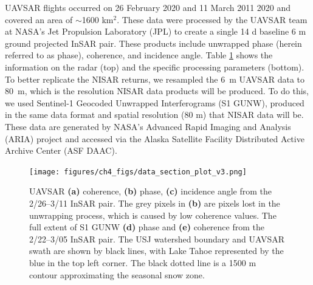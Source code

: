 UAVSAR flights occurred on 26 February 2020 and 11 March 2011 2020 and covered an area of $\sim$1600 km$^{2}$. These data were processed by the UAVSAR team at NASA's Jet Propulsion Laboratory (JPL) to create a single 14 d baseline 6 m ground projected InSAR pair. These products include unwrapped phase (herein referred to as phase), coherence, and incidence angle. Table \ref{table:uavsar_proc} shows the information on the radar (top) and the specific processing parameters (bottom). To better replicate the NISAR returns, we resampled the 6~m UAVSAR data to 80~m, which is the resolution NISAR data products will be produced. To do this, we used Sentinel-1 Geocoded Unwrapped Interferograms (S1 GUNW), produced in the same data format and spatial resolution (80 m) that NISAR data will be. These data are generated by NASA's Advanced Rapid Imaging and Analysis (ARIA) \citep{bekaertDevelopmentDisseminationStandardized2019,buzzangaSustainedMonitoringSubsidence2020} project and accessed via the Alaska Satellite Facility Distributed Active Archive Center (ASF DAAC).


\begin{figure}[ht]
\texttt{[image: figures/ch4\_figs/data\_section\_plot\_v3.png]}
\centering
\label{fig:uavsar_data}
\caption{UAVSAR \textbf{(a)} coherence, \textbf{(b)} phase, \textbf{(c)} incidence angle from the 2/26--3/11 InSAR pair. The grey pixels in \textbf{(b)} are pixels lost in the unwrapping process, which is caused by low coherence values. The full extent of S1 GUNW \textbf{(d)} phase and \textbf{(e)} coherence from the 2/22--3/05 InSAR pair. The USJ watershed boundary and UAVSAR swath are shown by black lines, with Lake Tahoe represented by the blue in the top left corner. The black dotted line is a 1500 m contour approximating the seasonal snow zone.}
\label{table:uavsar_proc}
\end{figure}
\clearpage

